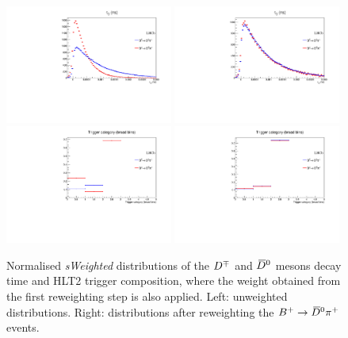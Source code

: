 \begin{figure}[t]
  \begin{center}
   \includegraphics[width=0.49\textwidth]{AA-Appdx-OSTaggers/figs/DTAU_BuVSBd_Unweighted.pdf}
   \includegraphics[width=0.49\textwidth]{AA-Appdx-OSTaggers/figs/DTAU_BuVSBd_Weighted.pdf} \\
   \includegraphics[width=0.49\textwidth]{AA-Appdx-OSTaggers/figs/TRIGCATB_BuVSBd_Unweighted.pdf}
   \includegraphics[width=0.49\textwidth]{AA-Appdx-OSTaggers/figs/TRIGCATB_BuVSBd_Weighted.pdf} \\
  \end{center}
  \vspace{-2mm}
  \caption{Normalised \emph{sWeighted} distributions of the $D^\mp$ and $\kern 0.2em\overline{\kern -0.2em D}{}^0$ mesons decay time and HLT2 trigger composition, where the weight obtained from the first reweighting step is also applied. Left: unweighted distributions. Right: distributions after reweighting the $B^+\rightarrow\kern 0.2em\overline{\kern -0.2em D}{}^0\pi^+$ events.}
  \label{fig:reweightingOSsecond}
\end{figure}

